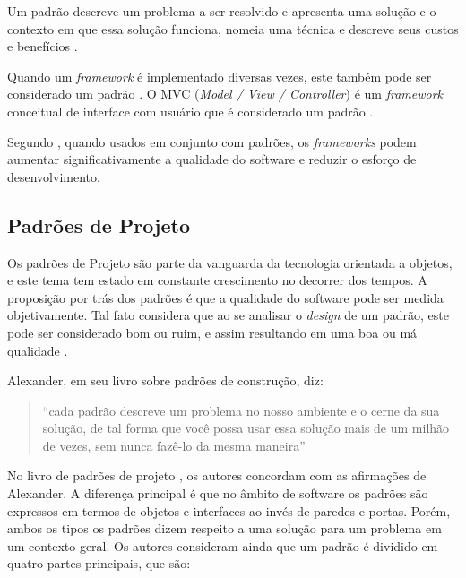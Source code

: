 Um padrão descreve um problema a ser resolvido e apresenta uma solução e o contexto em que essa solução funciona, nomeia uma técnica e descreve seus custos e benefícios \cite{Johnson:1997}.

Quando um \textit{framework} é implementado diversas vezes, este também pode ser considerado um padrão \cite{Johnson:1997}. O MVC (\textit{Model / View / Controller}) é um \textit{framework} conceitual de interface com usuário que é considerado um padrão \cite{Almeida:2006}.

Segundo \cite{Fayad:Schimidt:1997}, quando usados em conjunto com padrões, os \textit{frameworks} podem aumentar significativamente a qualidade do software e reduzir o esforço de desenvolvimento.

\subsection{Padrões de Projeto}

Os padrões de Projeto são parte da vanguarda da tecnologia orientada a objetos, e este tema tem estado em constante crescimento no decorrer dos tempos. A proposição por trás dos padrões é que a qualidade do software pode ser medida objetivamente. Tal fato considera que ao se analisar o \textit{design} de um padrão, este pode ser considerado bom ou ruim, e assim resultando em uma boa ou má qualidade \cite{Shalloway:Trott:2004}.

Alexander, em seu livro \cite{Alexander:1979} sobre padrões de construção, diz:

\begin{quote}
	``cada padrão descreve um problema no nosso
ambiente e o cerne da sua solução, de tal forma que você possa usar essa solução mais
de um milhão de vezes, sem nunca fazê-lo da mesma maneira''
\end{quote}

No livro de padrões de projeto \cite{Gamma:1995}, os autores concordam com as afirmações de Alexander. A diferença principal é que no âmbito de software os padrões são expressos em termos de objetos e interfaces ao invés de paredes e portas. Porém, ambos os tipos os padrões dizem respeito a uma solução para um problema em um contexto geral. Os autores consideram ainda que um padrão é dividido em quatro partes principais, que são:


